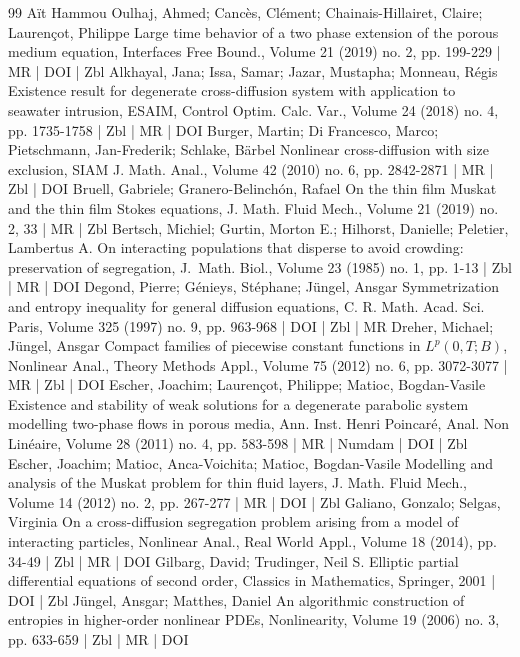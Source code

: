 \documentclass[10pt]{amsart}
\theoremstyle{definition}\newtheorem{defi}[theo]{Definition}\newtheorem{rema}[theo]{Remark}\newtheorem{exam}[theo]{Example}\newtheorem{exem}[theo]{Example}\newtheorem{nota}[theo]{Notation}
\begin{document}
\begin{thebibliography}{99}
Aït Hammou Oulhaj, Ahmed; Cancès, Clément; Chainais-Hillairet, Claire; Laurençot, Philippe Large time behavior of a two phase extension of the porous medium equation, Interfaces Free Bound., Volume 21 (2019) no. 2, pp. 199-229 | MR | DOI | Zbl
Alkhayal, Jana; Issa, Samar; Jazar, Mustapha; Monneau, Régis Existence result for degenerate cross-diffusion system with application to seawater intrusion, ESAIM, Control Optim. Calc. Var., Volume 24 (2018) no. 4, pp. 1735-1758 | Zbl | MR | DOI
Burger, Martin; Di Francesco, Marco; Pietschmann, Jan-Frederik; Schlake, Bärbel Nonlinear cross-diffusion with size exclusion, SIAM J. Math. Anal., Volume 42 (2010) no. 6, pp. 2842-2871 | MR | Zbl | DOI
Bruell, Gabriele; Granero-Belinchón, Rafael On the thin film Muskat and the thin film Stokes equations, J. Math. Fluid Mech., Volume 21 (2019) no. 2, 33 | MR | Zbl
Bertsch, Michiel; Gurtin, Morton E.; Hilhorst, Danielle; Peletier, Lambertus A. On interacting populations that disperse to avoid crowding: preservation of segregation, J. Math. Biol., Volume 23 (1985) no. 1, pp. 1-13 | Zbl | MR | DOI
Degond, Pierre; Génieys, Stéphane; Jüngel, Ansgar Symmetrization and entropy inequality for general diffusion equations, C. R. Math. Acad. Sci. Paris, Volume 325 (1997) no. 9, pp. 963-968 | DOI | Zbl | MR
Dreher, Michael; Jüngel, Ansgar Compact families of piecewise constant functions in ${L}^p (0,{T};{B})$, Nonlinear Anal., Theory Methods Appl., Volume 75 (2012) no. 6, pp. 3072-3077 | MR | Zbl | DOI
Escher, Joachim; Laurençot, Philippe; Matioc, Bogdan-Vasile Existence and stability of weak solutions for a degenerate parabolic system modelling two-phase flows in porous media, Ann. Inst. Henri Poincaré, Anal. Non Linéaire, Volume 28 (2011) no. 4, pp. 583-598 | MR | Numdam | DOI | Zbl
Escher, Joachim; Matioc, Anca-Voichita; Matioc, Bogdan-Vasile Modelling and analysis of the Muskat problem for thin fluid layers, J. Math. Fluid Mech., Volume 14 (2012) no. 2, pp. 267-277 | MR | DOI | Zbl
Galiano, Gonzalo; Selgas, Virginia On a cross-diffusion segregation problem arising from a model of interacting particles, Nonlinear Anal., Real World Appl., Volume 18 (2014), pp. 34-49 | Zbl | MR | DOI
Gilbarg, David; Trudinger, Neil S. Elliptic partial differential equations of second order, Classics in Mathematics, Springer, 2001 | DOI | Zbl
Jüngel, Ansgar; Matthes, Daniel An algorithmic construction of entropies in higher-order nonlinear PDEs, Nonlinearity, Volume 19 (2006) no. 3, pp. 633-659 | Zbl | MR | DOI

\end{thebibliography}
\end{document}
